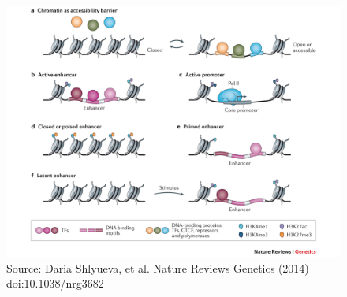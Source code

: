 \documentclass[slidestop,compress,11pt,xcolor=dvipsnames]{beamer}
\begin{document}
\begin{frame}[plain]%
 \vspace*{-0.3cm}
\begin{figure}
 \centering
 \includegraphics[width=1.05\linewidth]{intro/marks.pdf}{\tiny{\\Source: Daria Shlyueva, et al. Nature Reviews Genetics (2014) doi:10.1038/nrg3682}}
\end{figure}
\end{frame}
\end{document}
